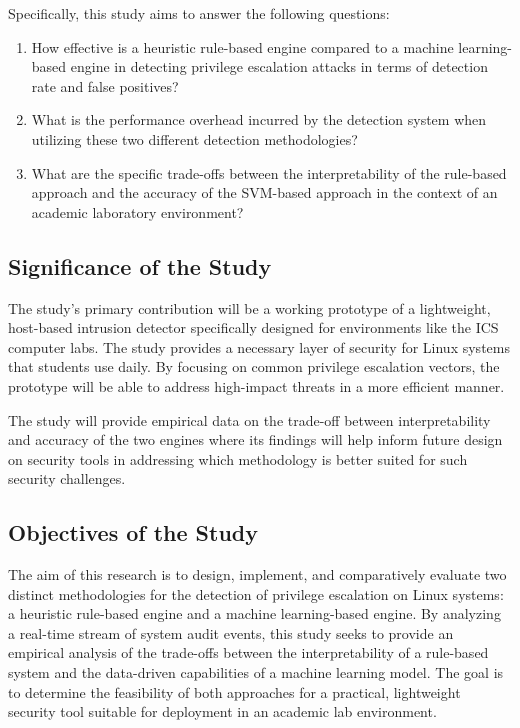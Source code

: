 \documentclass[journal]{./IEEEtran}
\begin{document}
Specifically, this study aims to answer the following questions:
\begin{enumerate}
    \item How effective is a heuristic rule-based engine compared to a machine learning-based engine in detecting privilege escalation attacks in terms of detection rate and false positives?
    \item What is the performance overhead incurred by the detection system when utilizing these two different detection methodologies?
    \item What are the specific trade-offs between the interpretability of the rule-based approach and the accuracy of the SVM-based approach in the context of an academic laboratory environment?
\end{enumerate}

\subsection{Significance of the Study}
The study's primary contribution will be a working prototype of a lightweight, host-based intrusion detector specifically designed for environments like the ICS computer labs. The study provides a necessary layer of security for Linux systems that students use daily. By focusing on common privilege escalation vectors, the prototype will be able to address high-impact threats in a more efficient manner.

The study will provide empirical data on the trade-off between interpretability and accuracy of the two engines where its findings will help inform future design on security tools in addressing which methodology is better suited for such security challenges.

\subsection{Objectives of the Study}
The aim of this research is to design, implement, and comparatively evaluate two distinct methodologies for the detection of privilege escalation on Linux systems: a heuristic rule-based engine and a machine learning-based engine. By analyzing a real-time stream of system audit events, this study seeks to provide an empirical analysis of the trade-offs between the interpretability of a rule-based system and the data-driven capabilities of a machine learning model. The goal is to determine the feasibility of both approaches for a practical, lightweight security tool suitable for deployment in an academic lab environment.
\end{document}
